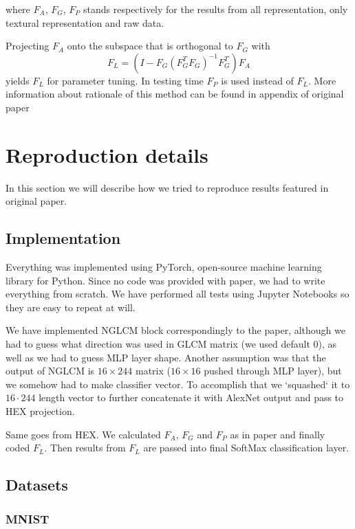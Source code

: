 \documentclass{article} %
\begin{document}
where $F_A$, $F_G$, $F_P$ stands respectively for the results from all representation, only textural representation and raw data.

Projecting $F_A$ onto the subspace that is orthogonal to $F_G$ with
$$F_L = (I - F_G(F_G^T F_G)^{-1} F_G^T) F_A$$
yields $F_L$ for parameter tuning. In testing time $F_P$ is used instead of $F_L$. More information about rationale of this method can be
found in appendix of original paper \citet{wang2018learning}

\pagebreak

\section{Reproduction details}
In this section we will describe how we tried to reproduce results featured in original paper.

\subsection{Implementation}

Everything was implemented using PyTorch, open-source machine learning library for Python. Since no code was provided with paper,
we had to write everything from scratch. We have performed all tests using Jupyter Notebooks so they are easy to repeat at will.

We have implemented NGLCM block correspondingly to the paper, although we had to guess what direction was used in 
GLCM matrix (we used default 0), as well as we had to guess MLP layer shape. Another assumption was that the output
of NGLCM is $16\times244$ matrix ($16\times16$ pushed through MLP layer), but we somehow had to make classifier vector. To accomplish that we `squashed`
it to $16\cdot244$ length vector to further concatenate it with AlexNet output and pass to HEX projection.

Same goes from HEX. We calculated $F_A$, $F_G$ and $F_P$ as in paper and finally coded $F_L$. Then results from $F_L$ 
are passed into final SoftMax classification layer.

\subsection{Datasets}

\subsubsection{MNIST}
\end{document}
